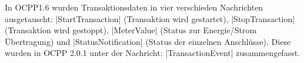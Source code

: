 %
%
\noindent In \acs{OCPP}1.6 wurden Transaktionsdaten in vier verschieden Nachrichten ausgetauscht: \spverb|StartTransaction| (Transaktion wird gestartet), \spverb|StopTransaction| (Transaktion wird gestoppt), \spverb|MeterValue| (Status zur Energie/Strom Übertragung) und \spverb|StatusNotification| (Status der einzelnen Anschlüsse). Diese wurden in \acs{OCPP} 2.0.1 unter der Nachricht: \spverb|TransactionEvent| zusammengefasst.\\
